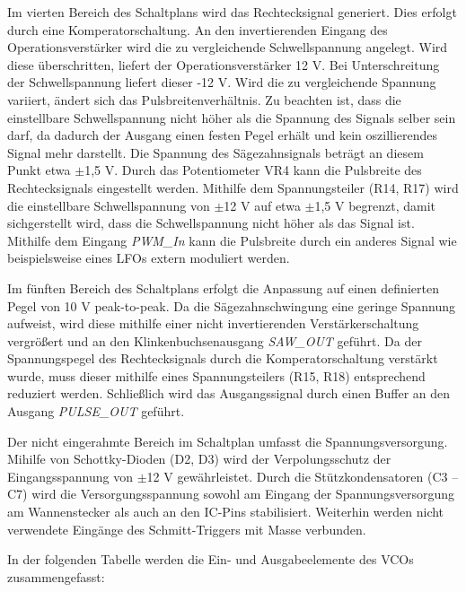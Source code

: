 Im vierten Bereich des Schaltplans wird das Rechtecksignal generiert. 
Dies erfolgt durch eine Komperatorschaltung.
An den invertierenden Eingang des Operationsverstärker wird die zu vergleichende Schwellspannung angelegt. 
Wird diese überschritten, liefert der Operationsverstärker 12 V. 
Bei Unterschreitung der Schwellspannung liefert dieser -12 V.
Wird die zu vergleichende Spannung variiert, ändert sich das Pulsbreitenverhältnis.
Zu beachten ist, dass die einstellbare Schwellspannung nicht höher als die Spannung des Signals selber sein darf, da dadurch der Ausgang einen festen Pegel erhält und kein oszillierendes Signal mehr darstellt.
Die Spannung des Sägezahnsignals beträgt an diesem Punkt etwa $\pm$1,5 V.
Durch das Potentiometer VR4 kann die Pulsbreite des Rechtecksignals eingestellt werden.
Mithilfe dem Spannungsteiler (R14, R17) wird die einstellbare Schwellspannung von $\pm$12 V auf etwa $\pm$1,5 V begrenzt, damit sichgerstellt wird, dass die Schwellspannung nicht höher als das Signal ist.
Mithilfe dem Eingang \textit{PWM\_In} kann die Pulsbreite durch ein anderes Signal wie beispielsweise eines LFOs extern moduliert werden.

Im fünften Bereich des Schaltplans erfolgt die Anpassung auf einen definierten Pegel von 10 V peak-to-peak. 
Da die Sägezahnschwingung eine geringe Spannung aufweist, wird diese mithilfe einer nicht invertierenden Verstärkerschaltung vergrößert und an den Klinkenbuchsenausgang \textit{SAW\_OUT} geführt. 
Da der Spannungspegel des Rechtecksignals durch die Komperatorschaltung verstärkt wurde, muss dieser mithilfe eines Spannungsteilers (R15, R18) entsprechend reduziert werden. 
Schließlich wird das Ausgangssignal durch einen Buffer an den Ausgang \textit{PULSE\_OUT} geführt.

Der nicht eingerahmte Bereich im Schaltplan umfasst die Spannungsversorgung. 
Mihilfe von Schottky-Dioden (D2, D3) wird der Verpolungsschutz der Eingangsspannung von $\pm$12 V gewährleistet. 
Durch die Stützkondensatoren (C3 -- C7) wird die Versorgungsspannung sowohl am Eingang der Spannungsversorgung am Wannenstecker als auch an den IC-Pins stabilisiert.
Weiterhin werden nicht verwendete Eingänge des Schmitt-Triggers mit Masse verbunden.

In der folgenden Tabelle werden die Ein- und Ausgabeelemente des VCOs zusammengefasst:


